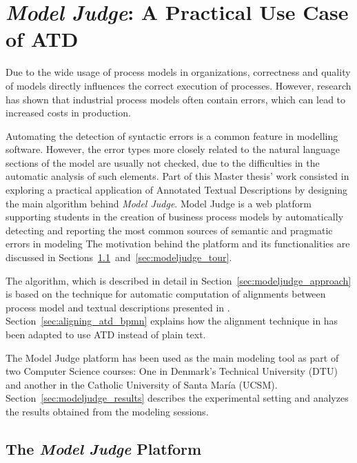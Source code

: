 \chapter{\emph{Model Judge}: A Practical Use Case of ATD}
\label{cha:modeljudge}

Due to the wide usage of process models in organizations, correctness and
quality of models directly influences the correct execution of processes.
However, research has shown that industrial process models often
contain errors, which can lead to increased costs in production.

Automating the detection of syntactic errors is a common feature in 
modelling software. However, the error types more closely related to the
natural language sections of the model are usually not checked, due to the
difficulties in the automatic analysis of such elements. Part of this
Master thesis' work consisted in exploring a practical application of Annotated
Textual Descriptions by designing the main algorithm behind \emph{Model
  Judge}. Model Judge is a web platform supporting
students in the creation of business process models by automatically detecting
and reporting the most common sources of semantic and pragmatic
errors in modeling The motivation behind the platform and its functionalities
are discussed in
Sections~\ref{sec:modeljudge_description}~and~\ref{sec:modeljudge_tour}.

The algorithm, which is described in detail in
Section~\ref{sec:modeljudge_approach} is based on the technique
for automatic computation of alignments between process model and textual
descriptions presented in \cite{10.1007/978-3-319-59536-8_26}.
Section~\ref{sec:aligning_atd_bpmn} explains how the alignment
technique in \cite{10.1007/978-3-319-59536-8_26} has been adapted to use ATD
instead of plain text.

The Model Judge platform has been used as the main modeling tool as
part of two Computer Science courses: One in Denmark's Technical University
(DTU) and another in the Catholic University of Santa Mar\'ia (UCSM).
Section~\ref{sec:modeljudge_results} describes the experimental setting and
analyzes the results obtained from the modeling sessions.

\section{The \emph{Model Judge} Platform}
\label{sec:modeljudge_description}
 


